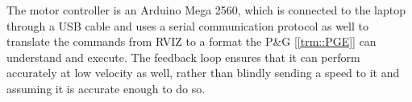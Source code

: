 The motor controller is an Arduino Mega 2560, which is connected to the laptop through a USB cable and uses a serial communication protocol as well to translate the commands from RVIZ to a format the P\&G [\ref{trm::PGE}] can understand and execute.
The feedback loop ensures that it can perform accurately at low velocity as well, rather than blindly sending a speed to it and assuming it is accurate enough to do so.

\newpage
